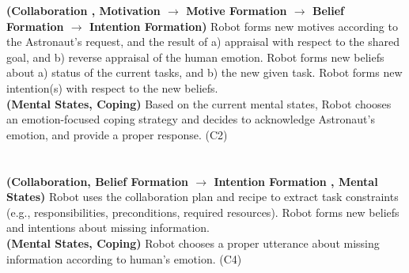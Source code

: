 \noindent\textbf{(Collaboration , Motivation $\rightarrow$ Motive Formation
$\rightarrow$ Belief Formation $\rightarrow$ Intention Formation)} Robot forms
new motives according to the Astronaut's request, and the result of a) appraisal
with respect to the shared goal, and b) reverse appraisal of the human emotion.
Robot forms new beliefs about a) status of the current tasks, and b) the new
given task. Robot forms new intention(s) with respect to the new beliefs.\\

\noindent\textbf{(Mental States, Coping)} Based on the current mental states,
Robot chooses an emotion-focused coping strategy and decides to acknowledge
Astronaut's emotion, and provide a proper response. (C2)\\

\noindent{}\\
  
\noindent{}\\

\noindent\textbf{(Collaboration, Belief Formation $\rightarrow$ Intention
Formation , Mental States)} Robot uses the collaboration plan and recipe to
extract task constraints (e.g., responsibilities, preconditions, required
resources). Robot forms new beliefs and intentions about missing information.\\

\noindent\textbf{(Mental States, Coping)} Robot chooses a proper utterance about
missing information according to human's emotion. (C4)\\

\noindent{}\\

\noindent{}\\

